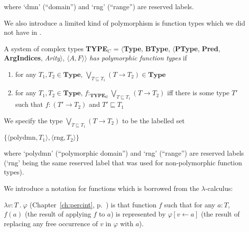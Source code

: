 where `dmn' (``domain'') and `rng' (``range'') are reserved labels.

We also introduce a limited kind of polymorphism is function types
which we did not have in \cite{Cooper2012}.


A system of complex types {\bf TYPE$_C$} = $\langle${\bf Type}, {\bf BType},
$\langle$\textbf{PType}, {\bf Pred}, \textbf{ArgIndices}, {\it
  Arity\/}$\rangle$, $\langle A,F\rangle$$\rangle$ \textit{has
  polymorphic function types} if
\begin{enumerate} 
 
\item for any $T_1,T_2 \in \textbf{Type}$,
  $\displaystyle{\bigvee_{T\sqsubseteq T_1}}(T\rightarrow T_2) \in \textbf{Type}$ 
 
\item for any $T_1,T_2 \in \textbf{Type}$,
  $f:_{\mathbf{TYPE_C}}\displaystyle{\bigvee_{T\sqsubseteq
      T_1}}(T\rightarrow T_2)$ iff there is some type $T'$ such that
  $f:(T'\rightarrow T_2)$ and $T'\sqsubseteq T_1$
   
 
\end{enumerate}

We
specify the type $\displaystyle{\bigvee_{T\sqsubseteq T_1}}(T\rightarrow T_2)$   to be the labelled set

$\{\langle\mathrm{polydmn},T_1\rangle,\langle\mathrm{rng},T_2\rangle\}$

where `polydmn' (``polymorphic domain'') and `rng' (``range'') are
reserved labels (`rng' being the same reserved label that was used for
non-polymorphic function types).






We introduce a notation for functions which is borrowed from the
$\lambda$-calculus:

$\lambda v\!:\!T\ .\ \varphi$ (Chapter~\ref{ch:percint},
p.~\pageref{ex:fun-notation}) is that function $f$ such that for any
$a:T$, $f(a)$ (the result of applying $f$ to $a$) is represented by
$\varphi[v\leftarrow a]$ (the result of replacing any free occurrence
of $v$ in $\varphi$ with $a$).





